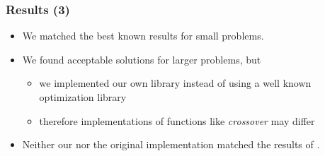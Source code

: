 
\begin{frame}
	\frametitle{Results (3)}
\begin{itemize}

	\item 	We matched the best known results for small problems.

	\item 	We found acceptable solutions for larger problems, but
		\begin{itemize}
			\item 		we implemented our own library instead of using a well known optimization library
			\item 		therefore implementations of functions like \emph{crossover} may differ
		\end{itemize}
		

	\item 	Neither our nor the original implementation matched the results of \cite[PSO'08]{PSO}.
\end{itemize}

	
\end{frame}


